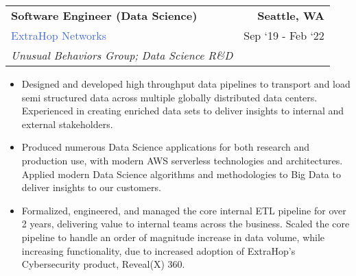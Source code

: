 \documentclass[10pt]{article}
\newcommand{\highlightcolor}{RoyalBlue}
\newcommand{\tabularxwidth}{\textwidth}
\begin{document}
    \begin{minipage}{\tabularxwidth}

        \begin{tabularx}{\tabularxwidth}{X r}
            \textbf{Software Engineer (Data Science)} & \textbf{Seattle, 
        WA} \\
            
    
    
    

    
        \textcolor{\highlightcolor}{ExtraHop Networks} & 
        
    Sep ‘19 - 
    Feb ‘22 \\
        
            \textit{Unusual Behaviors Group;}
                \textit{Data Science R\&D} & \\
        
    
            
        \end{tabularx}

        \begin{itemize}[noitemsep, topsep=3pt, parsep=0pt, partopsep=0pt]
            
                \item 
    Designed and developed high throughput data pipelines to transport and load semi structured data across multiple globally distributed data centers. Experienced in creating enriched data sets to deliver insights to internal and external stakeholders.
            
                \item 
    Produced numerous Data Science applications for both research and production use, with modern AWS serverless technologies and architectures. Applied modern Data Science algorithms and methodologies to Big Data to deliver insights to our customers.
            
                \item 
    Formalized, engineered, and managed the core internal ETL pipeline for over 2 years, delivering value to internal teams across the business. Scaled the core pipeline to handle an order of magnitude increase in data volume, while increasing functionality, due to increased adoption of ExtraHop's Cybersecurity product, Reveal(X) 360.
            

\end{itemize}
\end{minipage}
\end{document}
